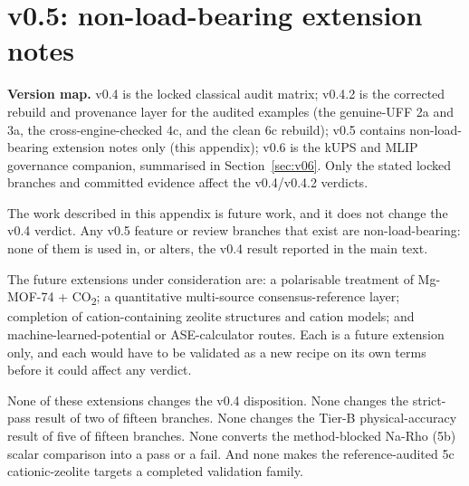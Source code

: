 \section{v0.5: non-load-bearing extension notes}\label{app:v05}

\textbf{Version map.} v0.4 is the locked classical audit matrix; v0.4.2 is the corrected rebuild and provenance layer for the audited examples (the genuine-UFF 2a and 3a, the cross-engine-checked 4c, and the clean 6c rebuild); v0.5 contains non-load-bearing extension notes only (this appendix); v0.6 is the kUPS and MLIP governance companion, summarised in Section~\ref{sec:v06}. Only the stated locked branches and committed evidence affect the v0.4/v0.4.2 verdicts.

The work described in this appendix is future work, and it does not change the v0.4 verdict. Any v0.5 feature or review branches that exist are non-load-bearing: none of them is used in, or alters, the v0.4 result reported in the main text.

The future extensions under consideration are: a polarisable treatment of Mg-MOF-74 + CO\textsubscript{2}; a quantitative multi-source consensus-reference layer; completion of cation-containing zeolite structures and cation models; and machine-learned-potential or ASE-calculator routes. Each is a future extension only, and each would have to be validated as a new recipe on its own terms before it could affect any verdict.

None of these extensions changes the v0.4 disposition. None changes the strict-pass result of two of fifteen branches. None changes the Tier-B physical-accuracy result of five of fifteen branches. None converts the method-blocked Na-Rho (5b) scalar comparison into a pass or a fail. And none makes the reference-audited 5c cationic-zeolite targets a completed validation family.
